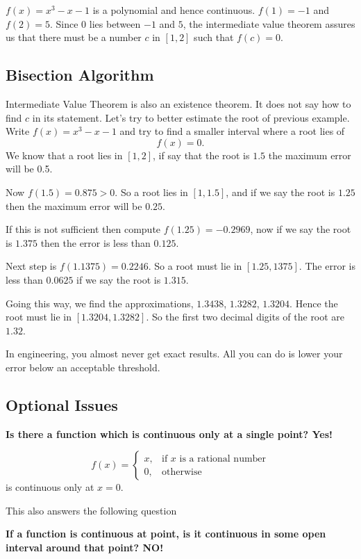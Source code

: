 \documentclass[../calc1-main.tex]{subfiles}
\begin{document}
\begin{solution}
	$f(x) = x^3 - x - 1$ is a polynomial and hence continuous. $f(1) = -1$ and $f(2) = 5$. Since $0$ lies between $-1$ and $5$, the intermediate value theorem assures us that there must be a number $c$ in $[1, 2]$ such that $f(c) = 0$.
\end{solution}

\subsection*{Bisection Algorithm}
Intermediate Value Theorem is also an existence theorem. It does not say how to find $c$ in its statement. Let's try to better estimate the root of previous example. Write $f(x) = x^3 - x - 1$ and try to find a smaller interval where a root lies of
\[
	f(x) = 0.
\]
We know that a root lies in $[1, 2]$, if say that the root is $1.5$ the maximum error will be 0.5.

Now $f(1.5)=0.875 > 0$. So a root lies in $[1, 1.5]$, and if we say the root is $1.25$ then the maximum error will be $0.25$.

If this is not sufficient then compute $f(1.25)=-0.2969$, now if we say the root is $1.375$ then the error is less than $0.125$.

Next step is $f(1.1375) = 0.2246$. So a root must lie in $[1.25, 1375]$. The error is less than $0.0625$ if we say the root is $1.315$.

Going this way, we find the approximations, $1.3438$, $1.3282$, $1.3204$. Hence the root must lie in $[1.3204, 1.3282]$. So the first two decimal digits of the root are $1.32$.

In engineering, you almost never get exact results. All you can do is lower your error below an acceptable threshold.

\subsection*{Optional Issues}
\textbf{Is there a function which is continuous only at a single point? Yes!}
\begin{example}
  \[
    f(x) =
    \begin{cases}
      x, & \text{if $x$ is a rational number} \\
      0, & \text{otherwise}
    \end{cases}
  \]
  is continuous only at $x=0$.
\end{example}
This also answers the following question

\textbf{If a function is continuous at point, is it continuous in some open interval around that point? NO!}
\end{document}
